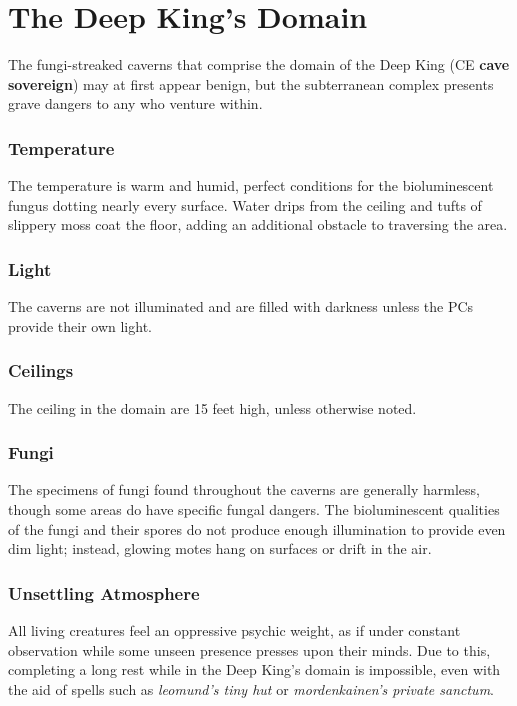 \documentclass[10pt,a4paper,twoside,bg=print,twocolumn,openany,nodeprecatedcode]{dndbook}
\begin{document}
\section{The Deep King's Domain}
The fungi-streaked caverns that comprise the domain of the Deep King (CE \textbf{cave sovereign}) may at first appear benign, but the subterranean complex presents grave dangers to any who venture within.

\subsubsection{Temperature}
The temperature is warm and humid, perfect conditions for the bioluminescent fungus dotting nearly every surface. Water drips from the ceiling and tufts of slippery moss coat the floor, adding an additional obstacle to traversing the area.

\subsubsection{Light}
The caverns are not illuminated and are filled with darkness unless the PCs provide their own light.

\subsubsection{Ceilings}
The ceiling in the domain are 15 feet high, unless otherwise noted.

\subsubsection{Fungi}
The specimens of fungi found throughout the caverns are generally harmless, though some areas do have specific fungal dangers. The bioluminescent qualities of the fungi and their spores do not produce enough illumination to provide even dim light; instead, glowing motes hang on surfaces or drift in the air.

\subsubsection{Unsettling Atmosphere}
All living creatures feel an oppressive psychic weight, as if under constant observation while some unseen presence presses upon their minds. Due to this, completing a long rest while in the Deep King's domain is impossible, even with the aid of spells such as \textit{leomund's tiny hut} or \textit{mordenkainen's private sanctum}.
\end{document}
